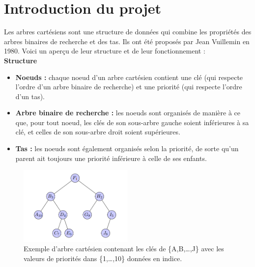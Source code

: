 \documentclass[a4paper,12pt]{report}
\begin{document}

\tableofcontents






\newpage

\chapter*{Introduction du projet}

Les arbres cartésiens sont une structure de données qui combine les propriétés des arbres binaires de recherche et des tas. Ils ont été proposés par Jean Vuillemin en 1980. Voici un aperçu de leur structure et de leur fonctionnement :\\[-0.4cm]

\textbf{Structure}
\begin{itemize}
    \item \textbf{Noeuds :} chaque noeud d'un arbre cartésien contient une clé (qui respecte l'ordre d'un arbre binaire de recherche) et une priorité (qui respecte l'ordre d'un tas).
    \item \textbf{Arbre binaire de recherche :} les noeuds sont organisés de manière à ce que, pour tout noeud, les clés de son sous-arbre gauche soient inférieures à sa clé, et celles de son sous-arbre droit soient supérieures.
    \item \textbf{Tas :} les noeuds sont également organisés selon la priorité, de sorte qu'un parent ait toujours une priorité inférieure à celle de ses enfants.
\end{itemize}

\begin{figure}[!h]
    \centering
    \includegraphics[width=0.5\textwidth]{../images/figure1.png}
    \caption{Exemple d'arbre cartésien contenant les clés de \{A,B,\dots,J\} avec les valeurs de priorités dans \{1,\dots,10\} données en indice.}
\end{figure}
\end{document}
